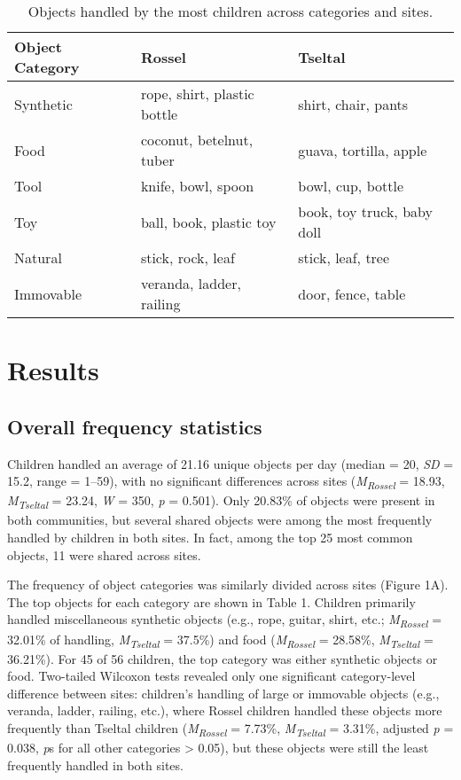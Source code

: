 \documentclass[10pt, letterpaper]{article}
\begin{document}
\begin{table}[ht]
\centering
\begingroup\small
\begin{tabular}{lll}
  \hline
Object Category & Rossel & Tseltal \\ 
  \hline
Synthetic & rope, shirt, plastic bottle & shirt, chair, pants \\ 
  Food & coconut, betelnut, tuber & guava, tortilla, apple \\ 
  Tool & knife, bowl, spoon & bowl, cup, bottle \\ 
  Toy & ball, book, plastic toy & book, toy truck, baby doll \\ 
  Natural & stick, rock, leaf & stick, leaf, tree \\ 
  Immovable & veranda, ladder, railing & door, fence, table \\ 
   \hline
\end{tabular}
\endgroup
\caption{Objects handled by the most children across categories and sites.} 
\end{table}

\hypertarget{results}{%
\section{Results}\label{results}}

\hypertarget{overall-frequency-statistics}{%
\subsection{Overall frequency
statistics}\label{overall-frequency-statistics}}

Children handled an average of 21.16 unique objects per day (median =
20, \emph{SD} = 15.2, range = 1--59), with no significant differences
across sites (\emph{M}\textsubscript{\emph{Rossel}} = 18.93,
\emph{M}\textsubscript{\emph{Tseltal}} = 23.24, \emph{W} = 350, \emph{p}
= 0.501). Only 20.83\% of objects were present in both communities, but
several shared objects were among the most frequently handled by
children in both sites. In fact, among the top 25 most common objects,
11 were shared across sites.

The frequency of object categories was similarly divided across sites
(Figure 1A). The top objects for each category are shown in Table 1.
Children primarily handled miscellaneous synthetic objects (e.g., rope,
guitar, shirt, etc.; \emph{M}\textsubscript{\emph{Rossel}} = 32.01\% of
handling, \emph{M}\textsubscript{\emph{Tseltal}} = 37.5\%) and food
(\emph{M}\textsubscript{\emph{Rossel}} = 28.58\%,
\emph{M}\textsubscript{\emph{Tseltal}} = 36.21\%). For 45 of 56
children, the top category was either synthetic objects or food.
Two-tailed Wilcoxon tests revealed only one significant category-level
difference between sites: children's handling of large or immovable
objects (e.g., veranda, ladder, railing, etc.), where Rossel children
handled these objects more frequently than Tseltal children
(\emph{M}\textsubscript{\emph{Rossel}} = 7.73\%,
\emph{M}\textsubscript{\emph{Tseltal}} = 3.31\%, adjusted \emph{p} =
0.038, \emph{p}s for all other categories \textgreater{} 0.05), but
these objects were still the least frequently handled in both sites.
\end{document}

